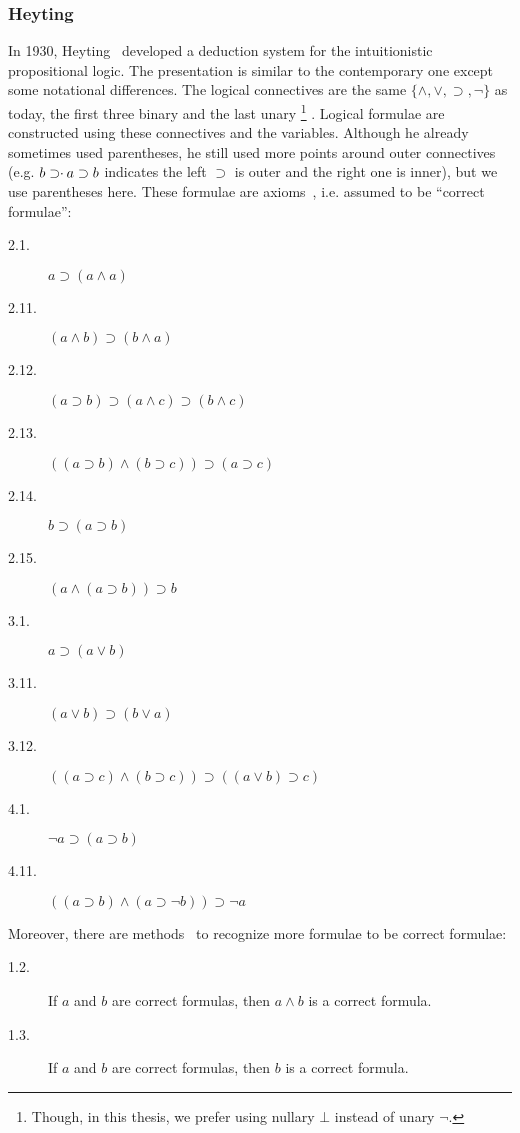 \subsubsection{Heyting}
In 1930, Heyting~\cite{heyting1930} developed a deduction system for the
intuitionistic propositional logic.  The presentation is similar to
the contemporary one except some notational differences.  The
logical connectives are the same $\{\wedge,\vee,\supset,\neg\}$ as today, the
first three binary and the last unary%
\footnote{Though, in this thesis, we prefer using nullary $\bot$ instead of unary
$\neg.$}%
.  Logical formulae are constructed
using these connectives and the variables.
Although he already sometimes used parentheses, he still used more points
around outer connectives (e.g. $b\supset \kern -3pt\cdot \kern 2pt  a
\supset b$ indicates the left $\supset$ is outer and the right one is
inner), but we use parentheses here.
These formulae are axioms~\cite{heyting1930}, i.e. assumed to be ``correct formulae'':
\begin{description}
 \item[2.1.] $a\supset (a\land a)$
 \item[2.11.] $(a\land b)\supset (b\land a)$
 \item[2.12.] $(a\supset b)\supset (a\land c)\supset (b\land c)$
 \item[2.13.] $((a\supset b)\land (b\supset c))\supset (a\supset c)$
 \item[2.14.] $b\supset (a\supset b)$
 \item[2.15.] $(a\land (a\supset b))\supset b$
 \item[3.1.] $a\supset (a\lor b)$
 \item[3.11.] $(a\lor b)\supset (b\lor a)$
 \item[3.12.] $((a\supset c)\land(b\supset c))\supset ((a\lor b)\supset
      c)$
 \item[4.1.] $\neg a\supset (a\supset b)$
 \item[4.11.] $((a\supset b)\land (a\supset \neg b)) \supset \neg a$
\end{description}
Moreover, there are methods~\cite{heyting1930} to recognize more formulae to be correct
formulae:
\begin{description}
 \item[1.2.] If $a$ and $b$ are correct formulas, then $a\land b$ is a correct
       formula.
 \item[1.3.] If $a$ and $b$ are correct formulas, then $b$ is a correct formula.
\end{description}

